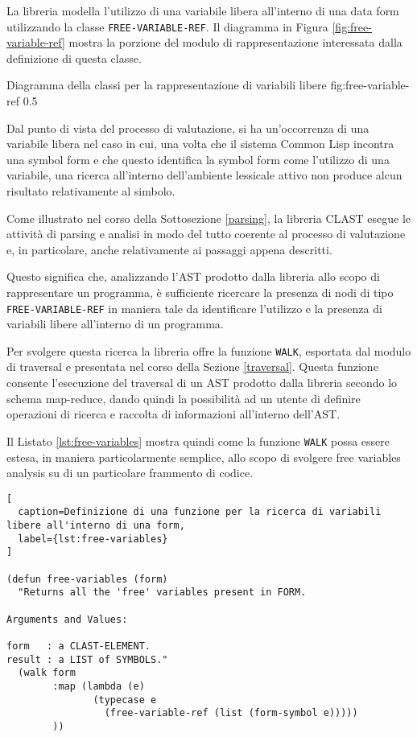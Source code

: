 La libreria modella l'utilizzo di una variabile libera all'interno di una data
form utilizzando la classe \texttt{FREE-VARIABLE-REF}. Il diagramma in Figura
\ref{fig:free-variable-ref} mostra la porzione del modulo di rappresentazione
interessata dalla definizione di questa classe.

      {Diagramma della classi per la rappresentazione di variabili libere}
      {fig:free-variable-ref}
      {0.5}

Dal punto di vista del processo di valutazione, si ha un'occorrenza di una
variabile libera nel caso in cui, una volta che il sistema Common Lisp incontra
una symbol form e che questo identifica la symbol form come l'utilizzo di una
variabile, una ricerca all'interno dell'ambiente lessicale attivo non produce
alcun risultato relativamente al simbolo.

Come illustrato nel corso della Sottosezione \ref{parsing}, la libreria CLAST
esegue le attività di parsing e analisi in modo del tutto coerente al processo
di valutazione e, in particolare, anche relativamente ai passaggi appena
descritti.


Questo significa che, analizzando l'AST prodotto dalla libreria allo scopo di
rappresentare un programma, è sufficiente ricercare la presenza di nodi di tipo
\texttt{FREE-VARIABLE-REF} in maniera tale da identificare l'utilizzo e la
presenza di variabili libere all'interno di un programma.

Per svolgere questa ricerca la libreria offre la funzione \texttt{WALK},
esportata dal modulo di traversal e presentata nel corso della Sezione
\ref{traversal}. Questa funzione consente l'esecuzione del traversal di un AST
prodotto dalla libreria secondo lo schema map-reduce, dando quindi la
possibilità ad un utente di definire operazioni di ricerca e raccolta di
informazioni all'interno dell'AST.

Il Listato \ref{lst:free-variables} mostra quindi come la funzione \texttt{WALK}
possa essere estesa, in maniera particolarmente semplice, allo scopo di svolgere
free variables analysis su di un particolare frammento di codice.

\begin{lstlisting}[
  caption=Definizione di una funzione per la ricerca di variabili libere all'interno di una form,
  label={lst:free-variables}
]

(defun free-variables (form)
  "Returns all the 'free' variables present in FORM.

Arguments and Values:

form   : a CLAST-ELEMENT.
result : a LIST of SYMBOLS."
  (walk form
        :map (lambda (e)
               (typecase e
                 (free-variable-ref (list (form-symbol e)))))
        ))

\end{lstlisting}

